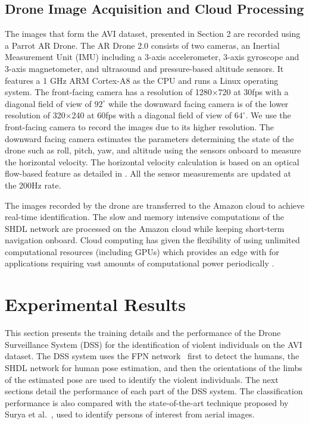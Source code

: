 \documentclass[10pt,twocolumn,letterpaper]{article}
\begin{document}
\subsection{Drone Image Acquisition and Cloud Processing}
The images that form the AVI dataset, presented in Section 2 are recorded using a Parrot AR Drone. The AR Drone 2.0 consists of two cameras, an Inertial Measurement Unit (IMU) including a 3-axis accelerometer, 3-axis gyroscope and 3-axis magnetometer, and ultrasound and pressure-based altitude sensors. It features a 1 GHz ARM Cortex-A8 as the CPU and runs a Linux operating system.  The front-facing camera has a resolution of 1280$\times$720 at 30fps with a diagonal field of view of $92^\circ$ while the downward facing camera is of the lower resolution of 320$\times$240 at 60fps with a diagonal field of view of $64^\circ$. We use the front-facing camera to record the images due to its higher resolution. The downward facing camera estimates the parameters determining the state of the drone such as roll, pitch, yaw, and altitude using the sensors onboard to measure the horizontal velocity. The horizontal velocity calculation is based on an optical flow-based feature as detailed in  \cite{bristeau2011navigation}. All the sensor measurements are updated at the 200Hz rate. 

The images recorded by the drone are transferred to the Amazon cloud to achieve real-time identification.  The slow and memory intensive computations of the SHDL network are processed on the Amazon cloud while keeping short-term navigation onboard. Cloud computing has given the flexibility of using unlimited computational resources (including GPUs) which provides an edge with for applications requiring vast amounts of computational power periodically \cite{goldberg2013cloud}.

\section{Experimental Results}
This section presents the training details and the performance of the Drone Surveillance System (DSS) for the identification of violent individuals on the AVI dataset. The DSS system uses the FPN network~\cite{hd} first to detect the humans, the SHDL network for human pose estimation, and then the orientations of the limbs of the estimated pose are used to identify the violent individuals. The next sections detail the performance of each part of the DSS system. The classification performance is also compared with the state-of-the-art technique proposed by Surya et al.~\cite{penmetsa2014autonomous}, used to identify persons of interest from aerial images.
\end{document}
